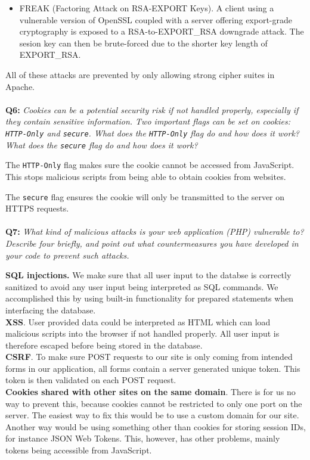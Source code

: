 \begin{itemize}
    \item
        FREAK (Factoring Attack on RSA-EXPORT Keys)\cite{freak-ssl-tls}.
        A client using a vulnerable version of OpenSSL coupled with a server offering export-grade cryptography is exposed to a RSA-to-EXPORT\_RSA downgrade attack.
        The sesion key can then be brute-forced due to the shorter key length of EXPORT\_RSA.

\end{itemize}

All of these attacks are prevented by only allowing strong cipher suites in Apache.

\paragraph{}
\textbf{Q6:}
\cprotect\textit{Cookies can be a potential security risk if not handled properly, especially if they contain sensitive information. Two important flags can be set on cookies: \verb/HTTP-Only/ and \verb/secure/. What does the \verb/HTTP-Only/ flag do and how does it work? What does the \verb/secure/ flag do and how does it work?}

The \verb/HTTP-Only/ flag makes sure the cookie cannot be accessed from JavaScript. This stops malicious scripts from being able to obtain cookies from websites.

The \verb/secure/ flag ensures the cookie will only be transmitted to the server on HTTPS requests.

\paragraph{}
\textbf{Q7:}
\textit{What kind of malicious attacks is your web application (PHP) vulnerable to? Describe four briefly, and point out what countermeasures you have developed in your code to prevent such attacks.}

\textbf{SQL injections.} We make sure that all user input to the databse is correctly sanitized to avoid any user input being interpreted as SQL commands.
We accomplished this by using built-in functionality for prepared statements when interfacing the database. \\
\textbf{XSS}. User provided data could be interpreted as HTML which can load malicious scripts into the browser if not handled properly.
All user input is therefore escaped before being stored in the database. \\
\textbf{CSRF}. To make sure POST requests to our site is only coming from intended forms in our application, all forms contain a server generated unique token.
This token is then validated on each POST request. \\
\textbf{Cookies shared with other sites on the same domain}. There is for us no way to prevent this, because cookies cannot be restricted to only one port on the server.
The easiest way to fix this would be to use a custom domain for our site.
Another way would be using something other than cookies for storing session IDs, for instance JSON Web Tokens.
This, however, has other problems, mainly tokens being accessible from JavaScript.

